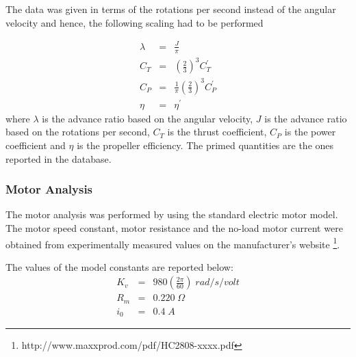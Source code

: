 \documentclass[11pt]{article}
\begin{document}
				The data was given in terms of the rotations per second instead of the angular velocity and hence, the following scaling had to be performed

				\begin{eqnarray*}
					\lambda &=& \frac{J}{\pi} \\
					C_T &=& \left( \frac{2}{3} \right)^3 C_T ^ \prime \\
					C_P &=& \frac{1}{\pi} \left( \frac{2}{3} \right)^3 C_P ^ \prime \\
					\eta &=& \eta ^ \prime
				\end{eqnarray*}
				where $\lambda$ is the advance ratio based on the angular velocity, $J$ is the advance ratio based on the rotations per second, $C_T$ is the thrust coefficient, $C_P$ is the power coefficient and $\eta$ is the propeller efficiency. The primed quantities are the ones reported in the database.

				\subsubsection{Motor Analysis}
				The motor analysis was performed by using the standard electric motor model. The motor speed constant, motor resistance and the no-load motor current were obtained from experimentally measured values on the manufacturer's website \footnote{http://www.maxxprod.com/pdf/HC2808-xxxx.pdf}.

				The values of the model constants are reported below:
				\begin{eqnarray*}
					K_v &=& 980 \left( \frac{2 \pi}{60} \right) \; rad/s/volt \\
					R_m &=& 0.220 \; \Omega \\
					i_0 &=& 0.4 \; A
				\end{eqnarray*}
\end{document}
